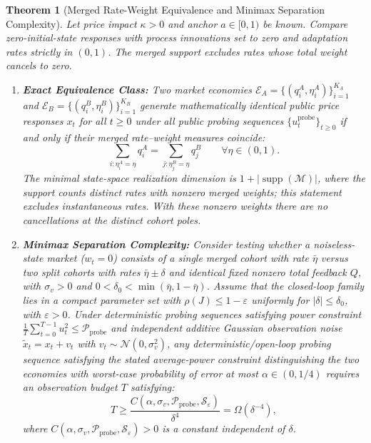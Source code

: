 \documentclass[12pt]{article}
\newtheorem{theorem}{Theorem}[section]
\theoremstyle{definition}
\theoremstyle{remark}
\begin{document}
\begin{theorem}[Merged Rate-Weight Equivalence and Minimax Separation Complexity]
\label{thm:m1_equivalence}\label{thm:m2_sample_complexity}
Let price impact $\kappa > 0$ and anchor $a \in [0,1)$ be known. Compare zero-initial-state responses with process innovations set to zero and adaptation rates strictly in $(0,1)$. The merged support excludes rates whose total weight cancels to zero.
\begin{enumerate}
    \item \textbf{Exact Equivalence Class:} Two market economies $\mathcal{E}_A = \{(q_i^A, \eta_i^A)\}_{i=1}^{K_A}$ and $\mathcal{E}_B = \{(q_i^B, \eta_i^B)\}_{i=1}^{K_B}$ generate mathematically identical public price responses $x_t$ for all $t \ge 0$ under all public probing sequences $\{u_t^{\text{probe}}\}_{t \ge 0}$ if and only if their merged rate--weight measures coincide:
    \begin{equation}
    \sum_{i: \eta_i^A = \eta} q_i^A = \sum_{j: \eta_j^B = \eta} q_j^B \qquad \forall \eta \in (0, 1).
    \label{eq:merged_measure}
    \end{equation}
    The minimal state-space realization dimension is $1 + |\operatorname{supp}(\mathcal{M})|$, where the support counts distinct rates with nonzero merged weights; this statement excludes instantaneous rates. With these nonzero weights there are no cancellations at the distinct cohort poles.
    \item \textbf{Minimax Separation Complexity:} Consider testing whether a noiseless-state market ($w_t = 0$) consists of a single merged cohort with rate $\bar{\eta}$ versus two split cohorts with rates $\bar{\eta}\pm\delta$ and identical fixed nonzero total feedback $Q$, with $\sigma_v>0$ and $0<\delta_0<\min(\bar\eta,1-\bar\eta)$. Assume that the closed-loop family lies in a compact parameter set with $\rho(J)\le1-\varepsilon$ uniformly for $|\delta|\le\delta_0$, with $\varepsilon>0$. Under deterministic probing sequences satisfying power constraint $\frac{1}{T} \sum_{t=0}^{T-1} u_t^2 \le \mathcal{P}_{\text{probe}}$ and independent additive Gaussian observation noise $\tilde{x}_t = x_t + v_t$ with $v_t \sim \mathcal{N}(0, \sigma_v^2)$, any deterministic/open-loop probing sequence satisfying the stated average-power constraint distinguishing the two economies with worst-case probability of error at most $\alpha \in (0, 1/4)$ requires an observation budget $T$ satisfying:
    \begin{equation}
    T \ge \frac{C(\alpha,\sigma_v,\mathcal P_{\text{probe}},\mathcal S_\varepsilon)}{\delta^4} = \Omega(\delta^{-4}),
    \label{eq:delta_fourth}
    \end{equation}
    where $C(\alpha,\sigma_v,\mathcal P_{\text{probe}},\mathcal S_\varepsilon) > 0$ is a constant independent of $\delta$.
\end{enumerate}
\end{theorem}
\end{document}
